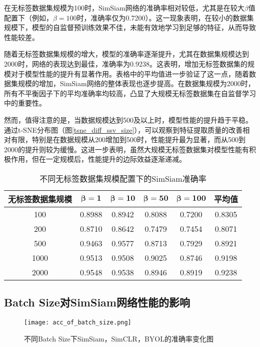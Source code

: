 \documentclass[master]{thesis-uestc}
\begin{document}
在无标签数据集规模为100时，SimSiam网络的准确率相对较低，尤其是在较大$\beta$值配置下（例如，$\beta=100$时，准确率仅为0.7200）。这一现象表明，在较小的数据集规模下，模型的自监督预训练效果不佳，未能有效地学习到足够的特征，从而导致性能较差。

随着无标签数据集规模的增大，模型的准确率逐渐提升，尤其在数据集规模达到2000时，网络的表现达到最佳，准确率为0.9238。这表明，增加无标签数据集的规模对于模型性能的提升有显著作用。表格中的平均值进一步验证了这一点，随着数据集规模的增加，SimSiam网络的整体表现也逐步提高。在数据集规模为2000时，所有不平衡因子下的平均准确率均较高，凸显了大规模无标签数据集在自监督学习中的重要性。

然而，值得注意的是，当数据规模达到500及以上时，模型性能的提升趋于平稳。通过t-SNE分布图（图\ref{tsne_diff_ssv_size}），可以观察到特征提取质量的改善相对有限，特别是在数据规模从200增加到500时，性能提升最为显著，而从500到2000的提升则较为缓慢。这进一步表明，虽然大规模无标签数据集对模型性能有积极作用，但在一定规模后，性能提升的边际效益逐渐递减。

\begin{table}[h]
    \centering
    \caption{不同无标签数据集规模配置下的SimSiam准确率}
    \begin{tabular}{cccccc}
    \toprule
    无标签数据集规模 & $\boldsymbol{\beta=1}$ & $\boldsymbol{\beta=10}$ & $\boldsymbol{\beta=50}$ & $\boldsymbol{\beta=100}$ & \textbf{平均值} \\
    \midrule
    100   & 0.8988 & 0.8942 & 0.8088 & 0.7200 & 0.8305 \\
    200   & 0.8710 & 0.8642 & 0.7479 & 0.7454 & 0.8071 \\
    500   & 0.9463 & 0.9577 & 0.8713 & 0.7929 & 0.8921 \\
    1000  & 0.9513 & 0.9508 & 0.9025 & 0.8746 & 0.9198 \\
    2000  & 0.9548 & 0.9538 & 0.8946 & 0.8919 & 0.9238 \\
    \bottomrule
    \end{tabular}
    \label{tab:fine_tune_acc_ssv_size}
\end{table}



\subsection{Batch Size对SimSiam网络性能的影响}

\begin{figure}[h]
    \centering
    \texttt{[image: acc\_of\_batch\_size.png]}
    \caption{不同Batch Size下SimSiam，SimCLR，BYOL的准确率变化图}
    \label{acc_of_batch_size}
\end{figure}
\end{document}
